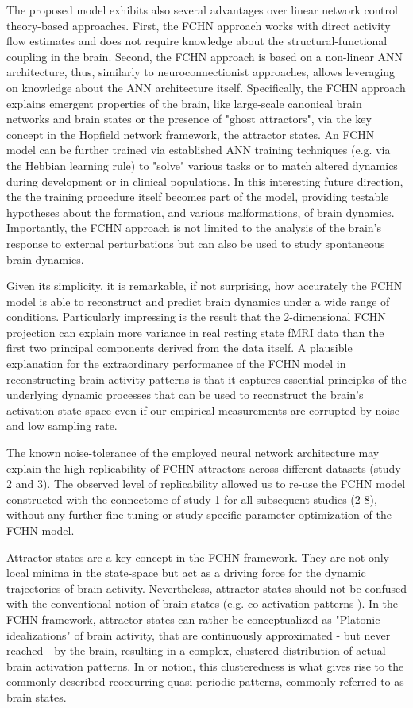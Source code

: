 \documentclass{article}
\begin{document}
The proposed model exhibits also several advantages over linear network control theory-based \citep{gu2015controllability} approaches. First, the FCHN approach works with direct activity flow estimates and does not require knowledge about the structural-functional coupling in the brain. Second, the FCHN approach is based on a non-linear ANN architecture, thus, similarly to neuroconnectionist approaches, allows leveraging on knowledge about the ANN architecture itself. Specifically, the FCHN approach explains emergent properties of the brain, like large-scale canonical brain networks and brain states or the presence of "ghost attractors", via the key concept in the Hopfield network framework, the attractor states. An FCHN model can be further trained via established ANN training techniques (e.g. via the Hebbian learning rule) to "solve" various tasks or to match altered dynamics during development or in clinical populations. In this interesting future direction, the the training procedure itself becomes part of the model, providing testable hypotheses about the formation, and various malformations, of brain dynamics.
Importantly, the FCHN approach is not limited to the analysis of the brain's response to external perturbations but can also be used to study spontaneous brain dynamics.

Given its simplicity, it is remarkable, if not surprising, how accurately the FCHN model is able to
reconstruct and predict brain dynamics under a wide range of conditions. Particularly impressing is the result
that the 2-dimensional FCHN projection can explain more variance in real resting state fMRI data than the first two principal components derived from the data itself.
A plausible explanation for the extraordinary performance of the FCHN model in reconstructing brain activity patterns is that it captures essential principles of the underlying dynamic processes that can be used to reconstruct the brain's activation state-space even if our empirical measurements are corrupted by noise and low sampling rate.

The known noise-tolerance of the employed neural network architecture may explain the high replicability of FCHN attractors across different datasets (study 2 and 3). The observed level of replicability allowed us to re-use the FCHN model constructed with the connectome of study 1 for all subsequent studies (2-8), without any further fine-tuning or study-specific parameter optimization of the FCHN model.

Attractor states are a key concept in the FCHN framework. They are not only local minima in the state-space but act as a driving force for the dynamic trajectories of brain activity. Nevertheless, attractor states should not be confused with the conventional notion of brain states (e.g. co-activation patterns \citep{chen2015introducing}). In the FCHN framework, attractor states can rather be conceptualized as "Platonic idealizations" of brain activity, that are continuously approximated - but never reached - by the brain, resulting in a complex, clustered distribution of actual brain activation patterns. In or notion, this clusteredness is what gives rise to the commonly described reoccurring quasi-periodic patterns, commonly referred to as brain states.
\end{document}
